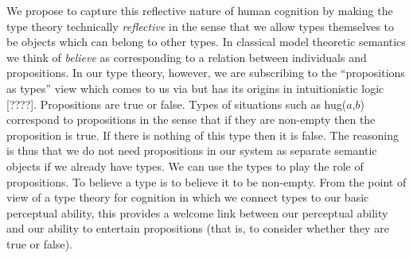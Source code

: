 We propose to capture this reflective nature of human cognition by
making the type theory technically \textit{reflective} in the sense
that we
allow types themselves to be objects which can belong to other types.
In classical model theoretic semantics we think of
\textit{believe} as corresponding to a relation between individuals
and propositions.  In our type theory, however, we are subscribing to
the ``propositions as types'' view which comes to us via
\cite{Martin-Loef1984} but has its origins in intuitionistic logic
[????].  Propositions are true or false.  Types of situations such as
hug($a$,$b$) correspond to propositions in the sense that if they are
non-empty then the proposition is true. If there is nothing of this
type then it is false.  The reasoning is thus that we do not need
propositions in our system as separate semantic objects if we already
have types.  We can use the types to play the role of propositions.
To believe a type is to believe it to be non-empty.  From the point of view
of a type theory for cognition in which we connect types to our basic
perceptual ability, this provides a welcome link between our perceptual
ability and our ability to entertain propositions (that is,  to
consider whether they are
true or false).

